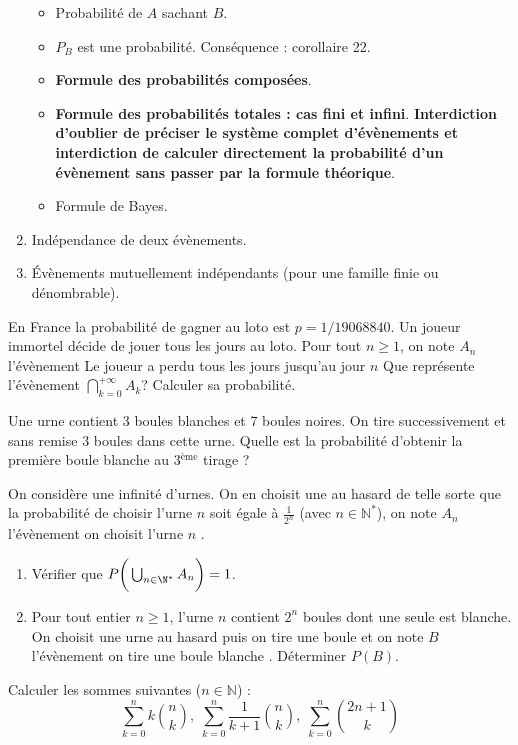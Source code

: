 \documentclass[twoside,a4paper,french,10pt]{VcCours}
\begin{document}
\begin{enumerate}
  \begin{itemize}
  \item Probabilité de $A$ sachant $B$.
  \item $P_B$ est une probabilité. Conséquence : corollaire 22.
  \item \textbf{Formule des probabilités composées}.
  \item \textbf{Formule des probabilités totales : cas fini et infini}. \textbf{Interdiction d'oublier de préciser le système complet d'évènements et interdiction de calculer directement la probabilité d'un évènement sans passer par la formule théorique}.
  \item Formule de Bayes.
  \end{itemize}
  \item Indépendance de deux évènements. 
  \item Évènements mutuellement indépendants (pour une famille finie ou dénombrable).
  \end{enumerate}
  
\begin{Exercice} 
  En France la probabilité de gagner au loto est $p=1/19 068 840$. 
  Un joueur immortel décide de jouer tous les jours au loto. 
  Pour tout $n \geq 1$, on note $A_n$ l'évènement
  \og Le joueur a perdu tous les jours jusqu'au jour $n$ \fg
  Que représente l'évènement $\bigcap_{k=0}^{+\infty}A_k$? Calculer sa probabilité.
\end{Exercice} 

\begin{Exercice} 
  Une urne contient 3 boules blanches et 7 boules noires. On tire successivement et sans remise 3 boules dans cette urne. Quelle est la probabilité d'obtenir la première boule blanche au 3$^{\text{ème}}$ tirage ?
\end{Exercice}   

\begin{Exercice} 
  On considère une infinité d'urnes. On en choisit une au hasard de telle sorte que la probabilité de choisir l'urne $n$ soit égale à $\frac{1}{2^n}$ (avec $n \in \mathbb{N}^*$), on note $A_n$ l'évènement \og on choisit l'urne $n$ \fg .
  \begin{enumerate}
    \item Vérifier que $P \bigg{(} \bigcup_{n \in \N^*} A_n \bigg{)} = 1$.
    \item Pour tout entier $n \geq 1$, l'urne $n$ contient $2^n$ boules dont une seule est blanche. On choisit une urne au hasard puis on tire une boule et on note $B$ l'évènement \og on tire une boule blanche \fg . Déterminer $P(B)$. 
  \end{enumerate}
\end{Exercice} 

\begin{Exercice}
  Calculer les sommes suivantes ($n \in \mathbb{N}$) : 
  $$\sum_{k=0}^n k \binom{n}{k}, \; \sum_{k=0}^n\frac{1}{k+1} \binom{n}{k}, \; \sum_{k=0}^n \binom{2n+1}{k}$$
\end{Exercice}   
    
\end{document}
